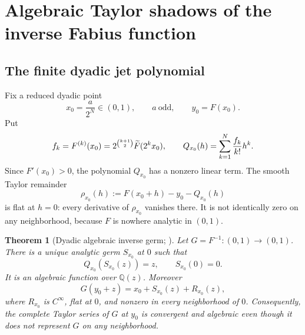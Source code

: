 \documentclass[11pt,oneside]{article}
\numberwithin{equation}{section}
\newtheorem{theorem}{Theorem}[section]
\theoremstyle{definition}
\theoremstyle{remark}
\newcommand{\Q}{\mathbb Q}
\newcommand{\InvF}{G}
\begin{document}
\section{Algebraic Taylor shadows of the inverse Fabius function}
\label{p2:sec:inverse-germs}

\subsection{The finite dyadic jet polynomial}

Fix a reduced dyadic point
\begin{equation}
 x_0=\frac{a}{2^N}\in(0,1),\qquad a\ \text{odd},
 \qquad y_0=F(x_0).
 \label{p2:eq:x0-y0}
\end{equation}
Put
\begin{equation}
 f_k=F^{(k)}(x_0)
 =2^{\binom{k+1}{2}}\widetilde F(2^kx_0),
 \qquad
 Q_{x_0}(h)=\sum_{k=1}^{N}\frac{f_k}{k!}h^k.
 \label{p2:eq:Q-dyadic}
\end{equation}
Since $F'(x_0)>0$, the polynomial $Q_{x_0}$ has a nonzero linear term.  The smooth Taylor
remainder
\begin{equation}
 \rho_{x_0}(h):=F(x_0+h)-y_0-Q_{x_0}(h)
 \label{p2:eq:rho-flat}
\end{equation}
is flat at $h=0$: every derivative of $\rho_{x_0}$ vanishes there.  It is not identically zero on any
neighborhood, because $F$ is nowhere analytic in $(0,1)$.

\begin{theorem}[Dyadic algebraic inverse germ; \statusnew]
\label{p2:thm:algebraic-inverse-germ}
Let $\InvF=F^{-1}:(0,1)\to(0,1)$.  There is a unique analytic germ $S_{x_0}$ at $0$ such that
\begin{equation}
 Q_{x_0}(S_{x_0}(z))=z,
 \qquad S_{x_0}(0)=0.
 \label{p2:eq:S-inverse}
\end{equation}
It is an algebraic function over $\Q(z)$.  Moreover
\begin{equation}
 \boxed{
 \InvF(y_0+z)=x_0+S_{x_0}(z)+R_{x_0}(z),
 }
 \label{p2:eq:G-shadow}
\end{equation}
where $R_{x_0}$ is $C^\infty$, flat at $0$, and nonzero in every neighborhood of $0$.
Consequently, the complete Taylor series of $\InvF$ at $y_0$ is convergent and algebraic even
though it does not represent $\InvF$ on any neighborhood.
\end{theorem}
\end{document}
